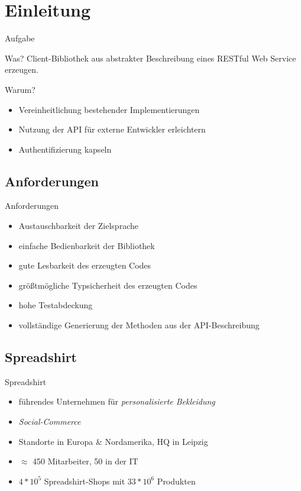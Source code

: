 \section{Einleitung}

\begin{frame}{Aufgabe}
    \begin{block}{Was?}
        Client-Bibliothek aus abstrakter Beschreibung eines RESTful Web Service erzeugen.
    \end{block}

    \begin{block}{Warum?}
        \begin{itemize}
            \item Vereinheitlichung bestehender Implementierungen
            \item Nutzung der API für externe Entwickler erleichtern
            \item Authentifizierung kapseln
        \end{itemize}
    \end{block}
\end{frame}

\subsection{Anforderungen}
\begin{frame}{Anforderungen}
    \begin{itemize}
        \item Austauschbarkeit der Zielsprache
        \item einfache Bedienbarkeit der Bibliothek
        \item gute Lesbarkeit des erzeugten Codes
        \item größtmögliche Typsicherheit des erzeugten Codes
        \item {\color{gray} hohe Testabdeckung}
        \item vollständige Generierung der Methoden aus der API-Beschreibung
    \end{itemize}
\end{frame}

\subsection{Spreadshirt}
\begin{frame}{Spreadshirt}
    \begin{itemize}
        \item führendes Unternehmen für \emph{personalisierte Bekleidung}
        \item \emph{Social-Commerce}
        \item Standorte in Europa \& Nordamerika, HQ in Leipzig
        \item $\approx$ 450 Mitarbeiter, 50 in der IT
        \item $4*10^5$ Spreadshirt-Shops mit $33*10^6$ Produkten
    \end{itemize}
\end{frame}

